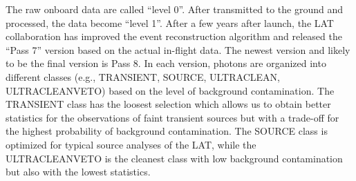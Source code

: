 
The raw onboard data are called ``level 0''. After transmitted 
to the ground and processed, the data become ``level 1''.
After a few years after launch, the LAT collaboration has
improved the event reconstruction algorithm and released
the ``Pass 7'' version based on the actual in-flight data.
The newest version 
and likely to be the final version is Pass 8.
In each version, photons are organized into different classes
(e.g., TRANSIENT, SOURCE, ULTRACLEAN, ULTRACLEANVETO)
based on the level of background contamination.
The TRANSIENT class has the loosest selection which allows us
to obtain better statistics for the observations of faint
transient sources but with a trade-off for the highest
probability of background contamination.
The SOURCE class is optimized for typical source
analyses of the LAT, while the ULTRACLEANVETO is the
cleanest class with low background contamination but
also with the lowest statistics.



